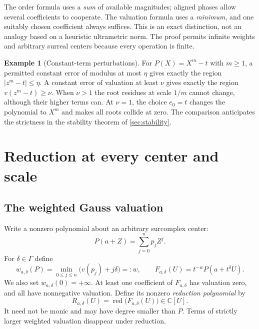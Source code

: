 \documentclass[11pt,letterpaper]{article}
\numberwithin{equation}{section}
\theoremstyle{definition}
\newtheorem{example}[example]{Example}
\theoremstyle{remark}
\newcommand{\C}{\mathbb C}
\newcommand{\red}{\operatorname{red}}
\begin{document}
The order formula uses a \emph{sum} of available magnitudes; aligned
phases allow several coefficients to cooperate. The valuation formula
uses a \emph{minimum}, and one suitably chosen coefficient always suffices.
This is an exact distinction, not an analogy based on a heuristic
ultrametric norm. The proof permits infinite weights and arbitrary
surreal centers because every operation is finite.

\begin{example}[Constant-term perturbations]\label{ex:constantuncertainty}
For $P(X)=X^m-t$ with $m\ge1$, a permitted constant error of modulus at
most $\eta$ gives exactly the region $|z^m-t|\le\eta$. A constant error of
valuation at least $\nu$ gives exactly the region $v(z^m-t)\ge\nu$.
When $\nu>1$ the root residues at scale $1/m$ cannot change, although their
higher terms can. At $\nu=1$, the choice $e_0=t$ changes the polynomial to
$X^m$ and makes all roots collide at zero. The comparison anticipates the
strictness in the stability theorem of \cref{sec:stability}.
\end{example}

\section{Reduction at every center and scale}\label{sec:reduction}

\subsection{The weighted Gauss valuation}
Write a nonzero polynomial about an arbitrary surcomplex center:
\[
 P(a+Z)=\sum_{j=0}^n p_jZ^j.
\]
For $\delta\in\Gamma$ define
\begin{equation}\label{eq:gaussweight}
 w_{a,\delta}(P)=\min_{0\le j\le n}\bigl(v(p_j)+j\delta\bigr)=:w,
 \qquad
 F_{a,\delta}(U)=t^{-w}P(a+t^\delta U).
\end{equation}
We also set $w_{a,\delta}(0)=+\infty$.
At least one coefficient of $F_{a,\delta}$ has valuation zero, and all
have nonnegative valuation. Define its nonzero \emph{reduction polynomial}
by
\begin{equation}\label{eq:reductionpoly}
 R_{a,\delta}(U)=\red\bigl(F_{a,\delta}(U)\bigr)\in\C[U].
\end{equation}
It need not be monic and may have degree smaller than $P$. Terms of
strictly larger weighted valuation disappear under reduction.
\end{document}
